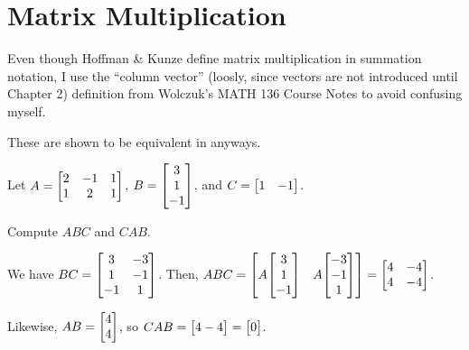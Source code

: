 \documentclass[notes]{agony}
\begin{document}
\section{Matrix Multiplication}

Even though Hoffman \& Kunze define matrix multiplication in summation notation,
I use the ``column vector'' (loosly, since vectors are not introduced until Chapter 2) definition
from Wolczuk's MATH 136 Course Notes to avoid confusing myself.

These are shown to be equivalent in  anyways.

\begin{xca}
  Let $A = \mqty[2&-1&1 \\ 1&2&1]$, $B = \mqty[3\\1\\-1]$, and $C = \mqty[1&-1]$.

  Compute $ABC$ and $CAB$.
\end{xca}
\begin{sol}
  We have $BC = \mqty[3&-3 \\ 1&-1 \\ -1&1]$.
  Then, $ABC = \mqty[A\mqty[3\\1\\-1] & A\mqty[-3\\-1\\1]] = \mqty[4&-4 \\ 4&-4]$.

  Likewise, $AB = \mqty[4\\4]$, so $CAB = \mqty[4-4] = \mqty[0]$.
\end{sol}
\end{document}
